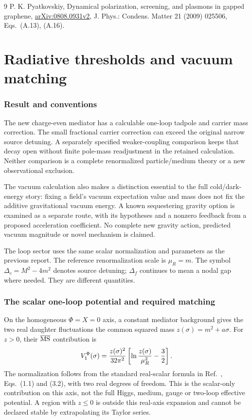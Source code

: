 \documentclass[11pt]{article}
\begin{document}
\begin{thebibliography}{9}
 P. K. Pyatkovskiy,
Dynamical polarization, screening, and plasmons in gapped graphene,
\href{https://arxiv.org/pdf/0808.0931v2}{arXiv:0808.0931v2},
J. Phys.: Condens. Matter 21 (2009) 025506, Eqs.~(A.13), (A.16).
\end{thebibliography}

\clearpage

\part{Radiative thresholds and vacuum matching}

\section{Result and conventions}
The new charge-even mediator has a calculable one-loop tadpole and carrier
mass correction. The small fractional carrier correction can exceed the
original narrow source detuning. A separately specified weaker-coupling
comparison keeps that decay open without finite pole-mass readjustment in
the retained calculation. Neither comparison is a complete renormalized
particle/medium theory or a new observational exclusion.

The vacuum calculation also makes a distinction essential to the full
cold/dark-energy story: fixing a field's vacuum expectation value and mass
does not fix the additive gravitational vacuum energy. A known sequestering
gravity option is examined as a separate route, with its hypotheses and a
nonzero feedback from a proposed acceleration coefficient. No complete new
gravity action, predicted vacuum magnitude or novel mechanism is claimed.

The loop sector uses the same scalar normalization and parameters as the
previous report. The reference renormalization scale is $\mu_R=m$.
The symbol $\Delta_c=M^2-4m^2$ denotes source detuning; $\Delta_f$
continues to mean a nodal gap where needed. They are different quantities.

\section{The scalar one-loop potential and required matching}
On the homogeneous $\Phi=X=0$ axis, a constant mediator background gives
the two real daughter fluctuations the common squared mass
$z(\sigma)=m^2+a\sigma$. For $z>0$, their
$\overline{\rm MS}$ contribution is
\begin{equation}
 V_1^\Phi(\sigma)={z(\sigma)^2\over32\pi^2}
       \left[\ln{z(\sigma)\over\mu_R^2}-{3\over2}\right].
 \label{rv:CW}
\end{equation}
The normalization follows from the standard real-scalar formula in
Ref.~\cite{rv:martin}, Eqs.~(1.1) and (3.2), with two real degrees of
freedom. This is the scalar-only contribution on this axis, not the full
Higgs, medium, gauge or two-loop effective potential. A region with
$z\leq0$ is outside this real-axis expansion and cannot be declared stable
by extrapolating its Taylor series.
\end{document}
